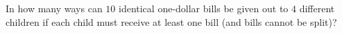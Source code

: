In how many ways can $10$ identical one-dollar bills be given out to $4$ different children if each child must receive at least one bill (and bills cannot be split)?
